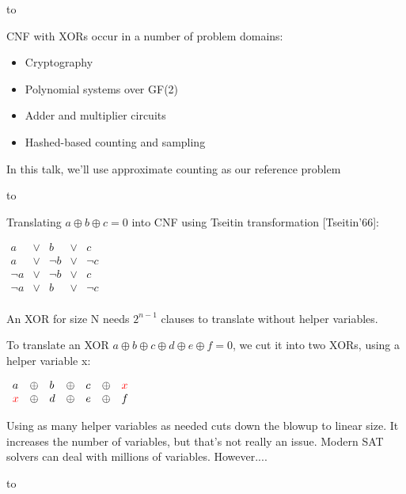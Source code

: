 \documentclass[aspectratio=196]{slides}
\def\TITLE#1{\hbox to \linewidth{\large #1\hfill}}
\def\BOTTOM{\vfill\newpage}
\def\SLIDE#1{\BOTTOM\TITLE{#1}}
\begin{document}
\vfill
\newpage


\SLIDE{CNF-XOR}

CNF with XORs occur in a number of problem domains:
\begin{itemize}
\item Cryptography
\item Polynomial systems over GF(2)
\item Adder and multiplier circuits
\item Hashed-based counting and sampling
\end{itemize}

In this talk, we'll use approximate counting as our reference problem

\vfill
\newpage


\SLIDE{XORs in CNF}

Translating $a\oplus b\oplus c=0$ into CNF using Tseitin transformation [Tseitin'66]:

$\begin{array}{lllll}
a& \vee &b& \vee &c\\
a& \vee &\neg b& \vee &\neg c\\
\neg a& \vee &\neg b& \vee &c\\
\neg a& \vee &b& \vee &\neg c\\
\end{array}$

An XOR for size N needs $2^{n-1}$ clauses to translate without helper variables.

To translate an XOR $a\oplus b\oplus c\oplus d\oplus e\oplus f=0$, we cut it into two XORs, using a helper variable {\color{red}x}:

$\begin{array}{lllllll}
a& \oplus &b& \oplus &c & \oplus &{\color{red}x}\\
{\color{red}x}& \oplus &d& \oplus &e & \oplus &f\\
\end{array}$

Using as many helper variables as needed cuts down the blowup to linear size. It increases the number of variables, but that's not really an issue. Modern SAT solvers can deal with millions of variables. However....

\vfill
\newpage

\SLIDE{Resolution on XOR formulas}
\end{document}
